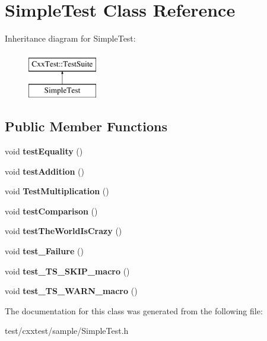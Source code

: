 \hypertarget{classSimpleTest}{\section{Simple\-Test Class Reference}
\label{classSimpleTest}
}
Inheritance diagram for Simple\-Test\-:\begin{figure}[H]
\begin{center}
\leavevmode
\includegraphics[height=2.000000cm]{classSimpleTest}
\end{center}
\end{figure}
\subsection*{Public Member Functions}
\begin{DoxyCompactItemize}
\item 
\hypertarget{classSimpleTest_a91e137980f9649409e7ee9d6d7215af6}{void {\bfseries test\-Equality} ()}\label{classSimpleTest_a91e137980f9649409e7ee9d6d7215af6}

\item 
\hypertarget{classSimpleTest_acc8e5ad4ef407369c23b11c2583e9cb8}{void {\bfseries test\-Addition} ()}\label{classSimpleTest_acc8e5ad4ef407369c23b11c2583e9cb8}

\item 
\hypertarget{classSimpleTest_a7df4b64fa770a01ace57b20c67e76788}{void {\bfseries Test\-Multiplication} ()}\label{classSimpleTest_a7df4b64fa770a01ace57b20c67e76788}

\item 
\hypertarget{classSimpleTest_aa2dedffb013899518347ef226944f996}{void {\bfseries test\-Comparison} ()}\label{classSimpleTest_aa2dedffb013899518347ef226944f996}

\item 
\hypertarget{classSimpleTest_a91c274fc76a70a49e44dc202560e33aa}{void {\bfseries test\-The\-World\-Is\-Crazy} ()}\label{classSimpleTest_a91c274fc76a70a49e44dc202560e33aa}

\item 
\hypertarget{classSimpleTest_a0a974e72c9b3e5cf4d867d5b1d31ce69}{void {\bfseries test\-\_\-\-Failure} ()}\label{classSimpleTest_a0a974e72c9b3e5cf4d867d5b1d31ce69}

\item 
\hypertarget{classSimpleTest_a23d23808a8b5bf8dcba480962f226aa4}{void {\bfseries test\-\_\-\-T\-S\-\_\-\-S\-K\-I\-P\-\_\-macro} ()}\label{classSimpleTest_a23d23808a8b5bf8dcba480962f226aa4}

\item 
\hypertarget{classSimpleTest_a50a66fe6d6958fe508894088b5ed70d5}{void {\bfseries test\-\_\-\-T\-S\-\_\-\-W\-A\-R\-N\-\_\-macro} ()}\label{classSimpleTest_a50a66fe6d6958fe508894088b5ed70d5}

\end{DoxyCompactItemize}


The documentation for this class was generated from the following file\-:\begin{DoxyCompactItemize}
\item 
test/cxxtest/sample/Simple\-Test.\-h\end{DoxyCompactItemize}
